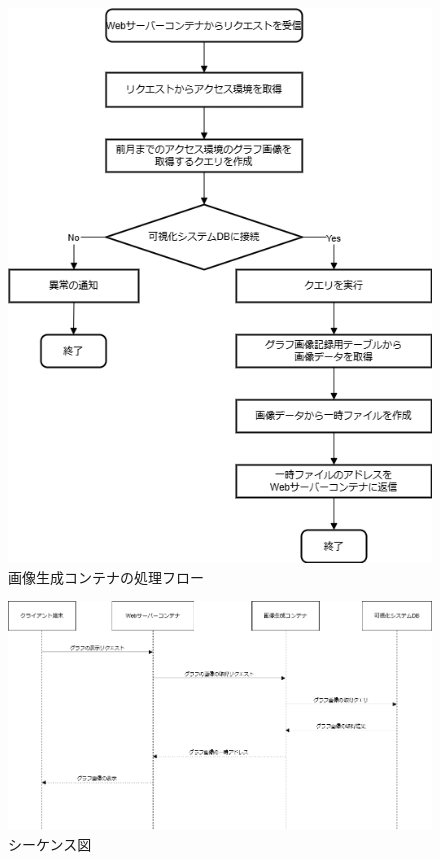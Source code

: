 \begin{figure}[htbp]
    \centering
    \includegraphics[width=1.0\textwidth]{fig/fig_flow.png}
    \caption{画像生成コンテナの処理フロー}
    \label{fig:fig_flow}
\end{figure}
\FloatBarrier

\begin{figure}[htbp]
    \centering
    \includegraphics[width=1.0\textwidth]{fig/sequence.png}
    \caption{シーケンス図}
    \label{fig:sequence}
\end{figure}
\FloatBarrier

